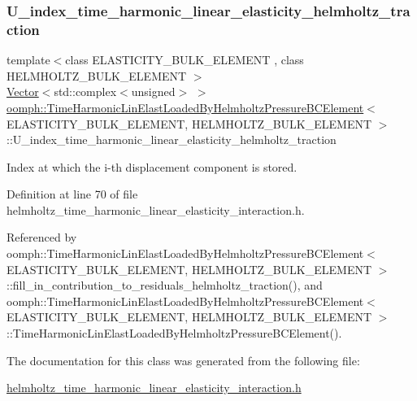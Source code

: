 \subsubsection{\texorpdfstring{U\+\_\+index\+\_\+time\+\_\+harmonic\+\_\+linear\+\_\+elasticity\+\_\+helmholtz\+\_\+traction}{U\_index\_time\_harmonic\_linear\_elasticity\_helmholtz\_traction}}
{\footnotesize\ttfamily template$<$class E\+L\+A\+S\+T\+I\+C\+I\+T\+Y\+\_\+\+B\+U\+L\+K\+\_\+\+E\+L\+E\+M\+E\+NT , class H\+E\+L\+M\+H\+O\+L\+T\+Z\+\_\+\+B\+U\+L\+K\+\_\+\+E\+L\+E\+M\+E\+NT $>$ \\
\hyperlink{classoomph_1_1Vector}{Vector}$<$std\+::complex$<$unsigned$>$ $>$ \hyperlink{classoomph_1_1TimeHarmonicLinElastLoadedByHelmholtzPressureBCElement}{oomph\+::\+Time\+Harmonic\+Lin\+Elast\+Loaded\+By\+Helmholtz\+Pressure\+B\+C\+Element}$<$ E\+L\+A\+S\+T\+I\+C\+I\+T\+Y\+\_\+\+B\+U\+L\+K\+\_\+\+E\+L\+E\+M\+E\+NT, H\+E\+L\+M\+H\+O\+L\+T\+Z\+\_\+\+B\+U\+L\+K\+\_\+\+E\+L\+E\+M\+E\+NT $>$\+::U\+\_\+index\+\_\+time\+\_\+harmonic\+\_\+linear\+\_\+elasticity\+\_\+helmholtz\+\_\+traction\hspace{0.3cm}{\ttfamily [protected]}}



Index at which the i-\/th displacement component is stored. 



Definition at line 70 of file helmholtz\+\_\+time\+\_\+harmonic\+\_\+linear\+\_\+elasticity\+\_\+interaction.\+h.



Referenced by oomph\+::\+Time\+Harmonic\+Lin\+Elast\+Loaded\+By\+Helmholtz\+Pressure\+B\+C\+Element$<$ E\+L\+A\+S\+T\+I\+C\+I\+T\+Y\+\_\+\+B\+U\+L\+K\+\_\+\+E\+L\+E\+M\+E\+N\+T, H\+E\+L\+M\+H\+O\+L\+T\+Z\+\_\+\+B\+U\+L\+K\+\_\+\+E\+L\+E\+M\+E\+N\+T $>$\+::fill\+\_\+in\+\_\+contribution\+\_\+to\+\_\+residuals\+\_\+helmholtz\+\_\+traction(), and oomph\+::\+Time\+Harmonic\+Lin\+Elast\+Loaded\+By\+Helmholtz\+Pressure\+B\+C\+Element$<$ E\+L\+A\+S\+T\+I\+C\+I\+T\+Y\+\_\+\+B\+U\+L\+K\+\_\+\+E\+L\+E\+M\+E\+N\+T, H\+E\+L\+M\+H\+O\+L\+T\+Z\+\_\+\+B\+U\+L\+K\+\_\+\+E\+L\+E\+M\+E\+N\+T $>$\+::\+Time\+Harmonic\+Lin\+Elast\+Loaded\+By\+Helmholtz\+Pressure\+B\+C\+Element().



The documentation for this class was generated from the following file\+:\begin{DoxyCompactItemize}
\item 
\hyperlink{helmholtz__time__harmonic__linear__elasticity__interaction_8h}{helmholtz\+\_\+time\+\_\+harmonic\+\_\+linear\+\_\+elasticity\+\_\+interaction.\+h}\end{DoxyCompactItemize}
